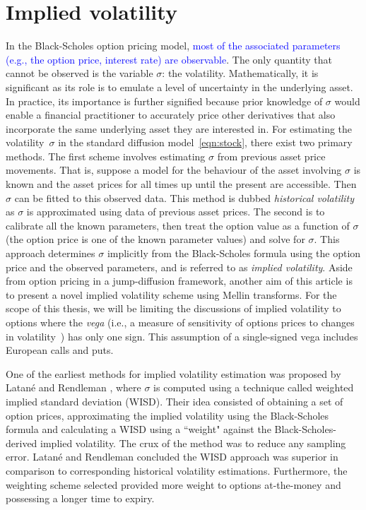 \section{Implied volatility}
		In the Black-Scholes option pricing model, \textcolor{blue}{most of the associated parameters (e.g., the option price, interest rate) are observable}. The only quantity that cannot be observed is the variable $\sigma$: the volatility. Mathematically, it is significant as its role is to emulate a level of uncertainty in the underlying asset. In practice, its importance is further signified because prior knowledge of $\sigma$ would enable a financial practitioner to accurately price other derivatives that also incorporate the same underlying asset they are interested in. 
		For estimating the volatility~$\sigma$ in the standard diffusion model~\eqref{eqn:stock}, there exist two primary methods. The first scheme involves estimating $\sigma$ from previous asset price movements. That is, suppose a model for the behaviour of the asset involving $\sigma$ is known and the asset prices for all times up until the present are accessible. Then $\sigma$ can be fitted to this observed data. This method is dubbed \emph{historical volatility} as $\sigma$ is approximated using data of previous asset prices. The second is to calibrate all the known parameters, then treat the option value as a function of $\sigma$ (the option price is one of the known parameter values) and solve for $\sigma$. This approach determines $\sigma$ implicitly from the Black-Scholes formula using the option price and the observed parameters, and is referred to as \emph{implied volatility}.  Aside from option pricing in a jump-diffusion framework, another aim of this article is to present a novel implied volatility scheme using Mellin transforms. For the scope of this thesis, we will be limiting the discussions of implied volatility to options where the \emph{vega} (i.e., a measure of sensitivity of options prices to changes in volatility~\cite{Vine2011}) has only one sign. This assumption of a single-signed vega includes European calls and puts.
		
One of the earliest methods for implied volatility estimation was proposed by Latan\'e and Rendleman \cite{Latane76}, where $\sigma$ is computed using a technique called weighted implied standard deviation (WISD). Their idea consisted of obtaining a set of option prices, approximating the implied volatility using the Black-Scholes formula and calculating a WISD using a ``weight" against the Black-Scholes-derived implied volatility. The crux of the method was to reduce any sampling error. Latan\'e and Rendleman concluded the WISD approach was superior in comparison to corresponding historical volatility estimations. Furthermore, the weighting scheme selected provided more weight to options at-the-money and possessing a longer time to expiry.

